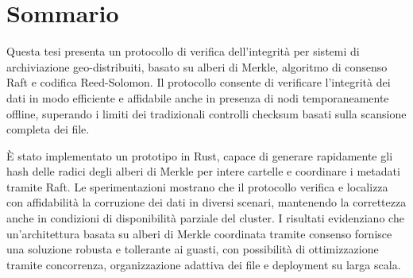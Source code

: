 \shipout\null
\chapter*{Sommario}
\thispagestyle{empty} 

Questa tesi presenta un protocollo di verifica dell'integrità per sistemi di
archiviazione geo-distribuiti, basato su alberi di Merkle, algoritmo di consenso Raft e codifica Reed-Solomon. Il protocollo consente di verificare l'integrità dei dati in modo efficiente e affidabile anche in presenza di nodi temporaneamente offline, superando i limiti dei tradizionali controlli checksum basati sulla scansione completa dei file.

È stato implementato un prototipo in Rust, capace di generare rapidamente gli hash delle radici degli alberi di Merkle per intere cartelle e coordinare i metadati tramite Raft. Le sperimentazioni mostrano che il protocollo verifica e localizza con affidabilità la corruzione dei dati in diversi scenari, mantenendo la correttezza anche in condizioni di disponibilità parziale del cluster. I risultati evidenziano che un'architettura basata su alberi di Merkle coordinata tramite consenso fornisce una soluzione robusta e tollerante ai guasti, con possibilità di ottimizzazione tramite concorrenza, organizzazione adattiva dei file e deployment su larga scala.
